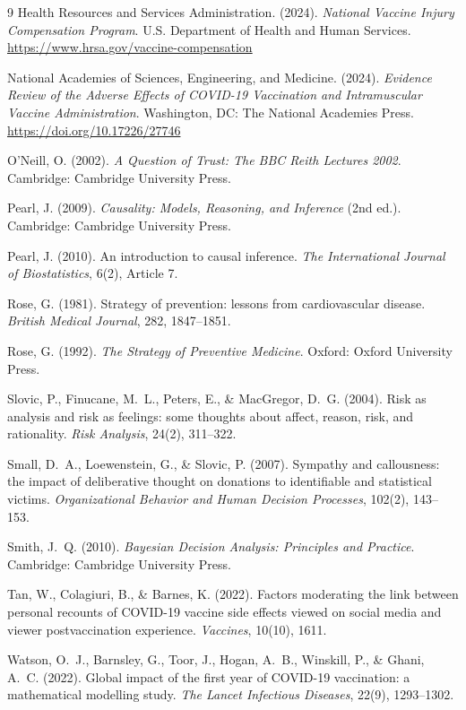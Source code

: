 \documentclass[11pt]{article}
\begin{document}
\begin{thebibliography}{9}
Health Resources and Services Administration. (2024). \textit{National Vaccine Injury Compensation Program}. U.S. Department of Health and Human Services. \url{https://www.hrsa.gov/vaccine-compensation}

National Academies of Sciences, Engineering, and Medicine. (2024). \textit{Evidence Review of the Adverse Effects of COVID-19 Vaccination and Intramuscular Vaccine Administration}. Washington, DC: The National Academies Press. \url{https://doi.org/10.17226/27746}

O'Neill, O. (2002). \textit{A Question of Trust: The BBC Reith Lectures 2002}. Cambridge: Cambridge University Press.

Pearl, J. (2009). \textit{Causality: Models, Reasoning, and Inference} (2nd ed.). Cambridge: Cambridge University Press.

Pearl, J. (2010). An introduction to causal inference. \textit{The International Journal of Biostatistics}, 6(2), Article 7.

Rose, G. (1981). Strategy of prevention: lessons from cardiovascular disease. \textit{British Medical Journal}, 282, 1847--1851.

Rose, G. (1992). \textit{The Strategy of Preventive Medicine}. Oxford: Oxford University Press.

Slovic, P., Finucane, M.~L., Peters, E., \& MacGregor, D.~G. (2004). Risk as analysis and risk as feelings: some thoughts about affect, reason, risk, and rationality. \textit{Risk Analysis}, 24(2), 311--322.

Small, D.~A., Loewenstein, G., \& Slovic, P. (2007). Sympathy and callousness: the impact of deliberative thought on donations to identifiable and statistical victims. \textit{Organizational Behavior and Human Decision Processes}, 102(2), 143--153.

Smith, J.~Q. (2010). \textit{Bayesian Decision Analysis: Principles and Practice}. Cambridge: Cambridge University Press.

Tan, W., Colagiuri, B., \& Barnes, K. (2022). Factors moderating the link between personal recounts of COVID-19 vaccine side effects viewed on social media and viewer postvaccination experience. \textit{Vaccines}, 10(10), 1611.

Watson, O.~J., Barnsley, G., Toor, J., Hogan, A.~B., Winskill, P., \& Ghani, A.~C. (2022). Global impact of the first year of COVID-19 vaccination: a mathematical modelling study. \textit{The Lancet Infectious Diseases}, 22(9), 1293--1302.

\end{thebibliography}
\end{document}
